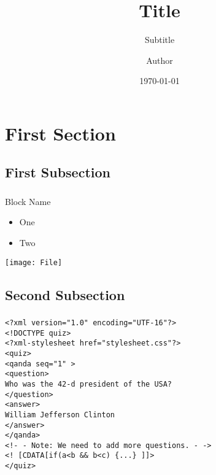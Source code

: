 \documentclass[t,pdf,hyperref={unicode}]{beamer} %
\title{Title}
\subtitle{Subtitle}
\author{Author}
\date{\today}
\institute[University]{Full Name}
\begin{document}
\frame[plain]{\titlepage}

\section{First Section}
\subsection{First Subsection}

\begin{frame}[c]
	\frametitle{\insertsection} 
	\framesubtitle{\insertsubsection}
	\begin{block}{Block Name}
		\begin{itemize}
			\item One\pause
			\item Two
		\end{itemize}
	\end{block}
	\texttt{[image: File]}
	\end{frame}

\subsection{Second Subsection}
 
\begin{frame}[fragile] 
	\frametitle{\insertsection} 
	\framesubtitle{\insertsubsection}
	\alert<1>{\alert<5>{\texttt{<?xml version="1.0"\ \!encoding="UTF-16"?>}}\\
	\alert<6>{\texttt{<!DOCTYPE quiz>}}\\
	\alert<7>{\texttt{<?xml-stylesheet href="stylesheet.css"?>}}\\}
	\alert<2>{\texttt{<quiz>}\\
	\alert<3>{\texttt{\quad<qanda seq="1"\!\,>}\\
	\texttt{\quad\quad<question>}\\
	\texttt{\quad\quad\quad Who was the 42-d president of the USA?}\\
	\texttt{\quad\quad</question>}\\
	\texttt{\quad\quad<answer>}\\
	\texttt{\quad\quad\quad William Jefferson Clinton}\\
	\texttt{\quad\quad</answer>}\\
	\texttt{\quad</qanda>}}\\
	\alert<4>{\texttt{\quad<!-\,\!- Note: We need to add more questions. -\,\!->}}\\
	\alert<8>{\texttt{<!\ [CDATA[if(a<b \&\& b<c) \{...\}\ ]]>}}\\
	\texttt{</quiz>}}	
\end{frame}
\end{document}

